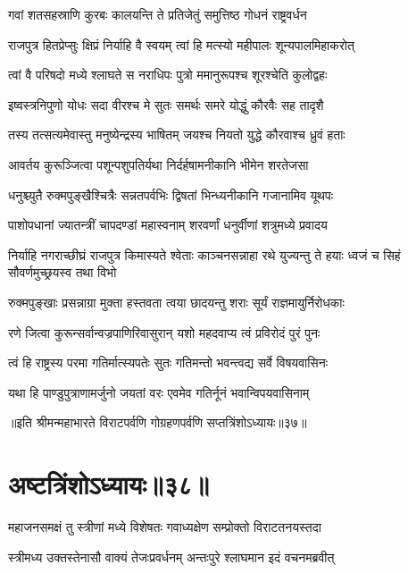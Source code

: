 \twolineshloka
{गवां शतसहस्राणि कुरबः कालयन्ति ते}
{प्रतिजेतुं समुत्तिष्ठ गोधनं राष्ट्रवर्धन}


\twolineshloka
{राजपुत्र हितप्रेप्सुः क्षिप्रं निर्याहि वै स्वयम्}
{त्वां हि मत्स्यो महीपालः शून्यपालमिहाकरोत्}


\twolineshloka
{त्वां वै परिषदो मध्ये श्लाघते स नराधिपः}
{पुत्रो ममानुरूपश्च शूरश्चेति कुलोद्वहः}


\twolineshloka
{इष्वस्त्रनिपुणो योधः सदा वीरश्च मे सुतः}
{समर्थः समरे योद्धुं कौरवैः सह तादृशै}


\twolineshloka
{तस्य तत्सत्यमेवास्तु मनुष्येन्द्रस्य भाषितम्}
{जयश्च नियतो युद्धे कौरवाश्च ध्रुवं हताः}


\twolineshloka
{आवर्तय कुरूञ्जित्वा पशून्पशुपतिर्यथा}
{निर्दर्हषामनीकानि भीमेन शरतेजसा}


\twolineshloka
{धनुश्च्युतै रुक्मपुङ्खैश्चित्रैः सन्नतपर्वभिः}
{द्विषतां भिन्ध्यनीकानि गजानामिव यूथपः}


\twolineshloka
{पाशोपधानां ज्यातन्त्रीं चापदण्डां महास्वनाम्}
{शरवर्णां धनुर्वीणां शत्रुमध्ये प्रवादय}


\threelineshloka
{निर्याहि नगराच्छीघ्रं राजपुत्र किमास्यते}
{श्वेताः काञ्चनसन्नाहा रथे युज्यन्तु ते हयाः}
{ध्वजं च सिहं सौवर्णमुच्छ्रयस्व तथा विभो}


\twolineshloka
{रुक्मपुङ्खाः प्रसन्नाग्रा मुक्ता हस्तवता त्वया}
{छादयन्तु शराः सूर्यं राज्ञमायुर्निरोधकाः}


\twolineshloka
{रणे जित्वा कुरून्सर्वान्वज्रपाणिरिवासुरान्}
{यशो महदवाप्य त्वं प्रविरोदं पुरं पुनः}


\twolineshloka
{त्वं हि राष्ट्रस्य परमा गतिर्मात्स्यपतेः सुतः}
{गतिमन्तो भवन्त्वद्य सर्वे विषयवासिनः}


\twolineshloka
{यथा हि पाण्डुपुत्राणामर्जुनो जयतां वरः}
{एवमेव गतिर्नूनं भवान्विपयवासिनाम्}

॥इति श्रीमन्महाभारते विराटपर्वणि गोग्रहणपर्वणि सप्तत्रिंशोऽध्यायः॥३७॥

\chapter{अष्टत्रिंशोऽध्यायः॥३८॥}

\twolineshloka
{महाजनसमक्षं तु स्त्रीणां मध्ये विशेषतः}
{गवाध्यक्षेण सम्प्रोक्तो विराटतनयस्तदा}


\twolineshloka
{स्त्रीमध्य उक्तस्तेनासौ वाक्यं तेजःप्रवर्धनम्}
{अन्तःपुरे श्लाघमान इदं वचनमब्रवीत्}




